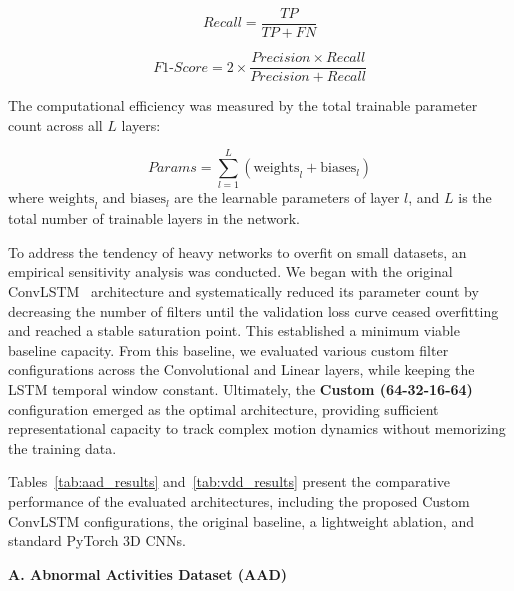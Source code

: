 \documentclass[11pt,a4paper]{article}
\begin{document}
	\begin{equation}
		Recall = \frac{TP}{TP + FN}
		\label{eq:recall}
	\end{equation}

	\begin{equation}
		F1\text{-}Score = 2 \times \frac{Precision \times Recall}{Precision + Recall}
		\label{eq:f1}
	\end{equation}

	The computational efficiency was measured by the total trainable parameter count across all $L$ layers:

	\begin{equation}
		Params = \sum_{l=1}^{L} (\text{weights}_l + \text{biases}_l)
		\label{eq:param_count}
	\end{equation}
	where $\text{weights}_l$ and $\text{biases}_l$ are the learnable parameters of 
	layer $l$, and $L$ is the total number of trainable layers in the network.

	To address the tendency of heavy networks to overfit on small datasets, an empirical sensitivity analysis was conducted. We began with the original ConvLSTM~\cite{vrskova2022} architecture and systematically reduced its parameter count by decreasing the number of filters until the validation loss curve ceased overfitting and reached a stable saturation point. This established a minimum viable baseline capacity. From this baseline, we evaluated various custom filter configurations across the Convolutional and Linear layers, while keeping the LSTM temporal window constant. Ultimately, the \textbf{Custom (64-32-16-64)} configuration emerged as the optimal architecture, providing sufficient representational capacity to track complex motion dynamics without memorizing the training data.

	Tables~\ref{tab:aad_results} and~\ref{tab:vdd_results} present the comparative performance of the evaluated architectures, including the proposed Custom ConvLSTM configurations, the original baseline, a lightweight ablation, and standard PyTorch 3D CNNs.

	\vspace{0.3cm}
	\textbf{A. Abnormal Activities Dataset (AAD)}
\end{document}
